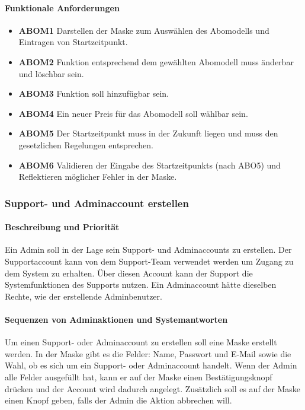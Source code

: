 \paragraph{Funktionale Anforderungen}
\begin{itemize}
	\item \textbf{ABOM1} Darstellen der Maske zum Auswählen des Abomodells und Eintragen von Startzeitpunkt.
	\item \textbf{ABOM2} Funktion entsprechend dem gewählten Abomodell muss änderbar und löschbar sein.
	\item \textbf{ABOM3} Funktion soll hinzufügbar sein.
	\item \textbf{ABOM4} Ein neuer Preis für das Abomodell soll wählbar sein.
	\item \textbf{ABOM5} Der Startzeitpunkt muss in der Zukunft liegen und muss den gesetzlichen Regelungen entsprechen.
	\item \textbf{ABOM6} Validieren der Eingabe des Startzeitpunkts (nach ABO5) und Reflektieren möglicher Fehler
	      in der Maske.
\end{itemize}


\subsubsection{Support- und Adminaccount erstellen}
\paragraph{Beschreibung und Priorität}
Ein Admin soll in der Lage sein Support- und Adminaccounts zu erstellen.
Der Supportaccount kann von dem Support-Team verwendet werden um Zugang zu dem System zu erhalten.
Über diesen Account kann der Support die Systemfunktionen des Supports nutzen.
Ein Adminaccount hätte dieselben Rechte, wie der erstellende Adminbenutzer.
\paragraph{Sequenzen von Adminaktionen und Systemantworten}
Um einen Support- oder Adminaccount zu erstellen soll eine Maske erstellt werden.
In der Maske gibt es die Felder: Name, Passwort und E-Mail sowie die Wahl, ob es sich um ein Support- oder Adminaccount
handelt.
Wenn der Admin alle Felder ausgefüllt hat, kann er auf der Maske einen Bestätigungsknopf drücken
und der Account wird dadurch angelegt.
Zusätzlich soll es auf der Maske einen  Knopf geben, falls der Admin die Aktion abbrechen will.
